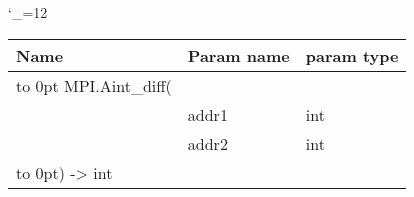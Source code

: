 \begingroup \catcode`\_=12 \tt
\begin{tabular}{lll}
\toprule
\textrm{Name}&\textrm{Param name}&\textrm{param type}\\
\midrule
\hbox to 0pt {MPI.Aint_diff(\hss}\\
& addr1 & int\\
& addr2 & int\\
\hbox to 0pt{) -> int\hss}\\
\bottomrule
\end{tabular}
\endgroup
